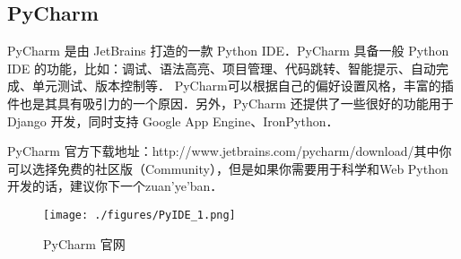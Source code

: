 
\begin{issues}
\issueDraft
\issueTODO
\end{issues}

\subsection{PyCharm}

PyCharm 是由 JetBrains 打造的一款 Python IDE．PyCharm 具备一般 Python IDE 的功能，比如：调试、语法高亮、项目管理、代码跳转、智能提示、自动完成、单元测试、版本控制等． PyCharm可以根据自己的偏好设置风格，丰富的插件也是其具有吸引力的一个原因．另外，PyCharm 还提供了一些很好的功能用于 Django 开发，同时支持 Google App Engine、IronPython．

PyCharm 官方下载地址：http://www.jetbrains.com/pycharm/download/其中你可以选择免费的社区版（Community），但是如果你需要用于科学和Web Python开发的话，建议你下一个zuan'ye'ban．

\begin{figure}[ht]
\centering
\texttt{[image: ./figures/PyIDE\_1.png]}
\caption{PyCharm 官网} \label{PyIDE_fig1}
\end{figure}
